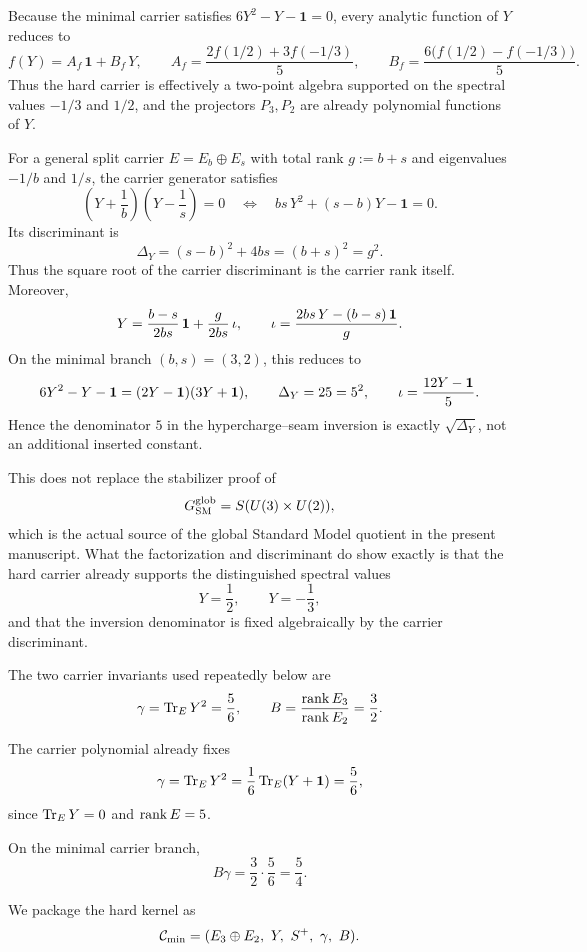 \begin{remark}
Because the minimal carrier satisfies $6Y^2-Y-\mathbf 1=0$, every analytic function of $Y$ reduces to
\[
f(Y)=A_f\,\mathbf 1+B_f\,Y,
\qquad
A_f=\frac{2f(1/2)+3f(-1/3)}{5},
\qquad
B_f=\frac{6\bigl(f(1/2)-f(-1/3)\bigr)}{5}.
\]
Thus the hard carrier is effectively a two-point algebra supported on the spectral values $-1/3$ and $1/2$, and the projectors $P_3,P_2$ are already polynomial functions of $Y$.
\end{remark}

\begin{remark}\label{rem:carrier-discriminant}
For a general split carrier $E=E_b\oplus E_s$ with total rank $g:=b+s$ and eigenvalues $-1/b$ and $1/s$, the carrier generator satisfies
\[
\left(Y+\frac{1}{b}\right)\left(Y-\frac{1}{s}\right)=0
\quad\Longleftrightarrow\quad
bs\,Y^2+(s-b)Y-\mathbf 1=0.
\]
Its discriminant is
\[
\Delta_Y=(s-b)^2+4bs=(b+s)^2=g^2.
\]
Thus the square root of the carrier discriminant is the carrier rank itself. Moreover,
\[
Y=\frac{b-s}{2bs}\,\mathbf 1+\frac{g}{2bs}\,\iota,
\qquad
\iota=\frac{2bs\,Y-(b-s)\,\mathbf 1}{g}.
\]
On the minimal branch $(b,s)=(3,2)$, this reduces to
\[
6Y^2-Y-\mathbf 1=(2Y-\mathbf 1)(3Y+\mathbf 1),
\qquad
\Delta_Y=25=5^2,
\qquad
\iota=\frac{12Y-\mathbf 1}{5}.
\]
Hence the denominator $5$ in the hypercharge--seam inversion is exactly $\sqrt{\Delta_Y}$, not an additional inserted constant.

This does not replace the stabilizer proof of
\[
G_{\mathrm{SM}}^{\mathrm{glob}}=S(U(3)\times U(2)),
\]
which is the actual source of the global Standard Model quotient in the present manuscript. What the factorization and discriminant do show exactly is that the hard carrier already supports the distinguished spectral values
\[
Y=\frac{1}{2},
\qquad
Y=-\frac{1}{3},
\]
and that the inversion denominator is fixed algebraically by the carrier discriminant.
\end{remark}

The two carrier invariants used repeatedly below are
\[
\gamma=\operatorname{Tr}_EY^2=\frac56,
\qquad
B=\frac{\operatorname{rank} E_3}{\operatorname{rank} E_2}=\frac32.
\]
\begin{corollary}
The carrier polynomial already fixes
\[
\gamma=\operatorname{Tr}_EY^2=\frac16\operatorname{Tr}_E(Y+\mathbf 1)=\frac56,
\]
since $\operatorname{Tr}_EY=0$ and $\operatorname{rank} E=5$.
\end{corollary}

\begin{corollary}
\label{cor:minimal-carrier-compression}
On the minimal carrier branch,
\[
B\gamma=\frac32\cdot\frac56=\frac54.
\]
\end{corollary}

We package the hard kernel as
\[
\Cmin=(E_3\oplus E_2,\ Y,\ S^+,\ \gamma,\ B).
\]

